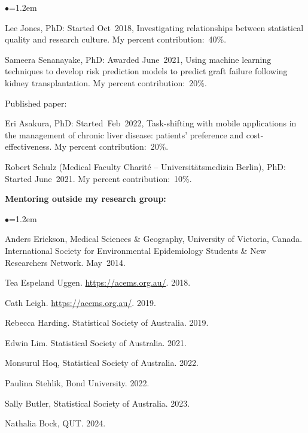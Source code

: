 \documentclass[a4paper,11pt]{article}
\renewcommand{\labelitemi}{$\bullet$}
\begin{document}
\begin{raggedright}
\begin{list}{\labelitemi}{\leftmargin=1.2em}
\item Lee Jones, PhD: Started Oct~2018, Investigating relationships between statistical quality and research culture. My percent contribution:~40\%.

\item Sameera Senanayake, PhD: Awarded June~2021, Using machine learning techniques to develop risk prediction models to predict graft failure following kidney transplantation. My percent contribution:~20\%.

Published paper: 

% 
\item Eri Asakura, PhD: Started~Feb~2022, Task-shifting with mobile applications in the management of chronic liver disease: patients’ preference and cost-effectiveness. My percent contribution:~20\%.


% 
\item Robert Schulz (Medical Faculty Charit\'{e} – Universit\"{a}tsmedizin Berlin), PhD: Started June~2021. My percent contribution:~10\%.
\end{list}

\textbf{Mentoring outside my research group:}

\begin{list}{\labelitemi}{\leftmargin=1.2em}\addtolength{\itemsep}{-0.5\baselineskip}
\item Anders Erickson, Medical Sciences \& Geography, University of Victoria, Canada. International Society for Environmental Epidemiology Students \& New Researchers Network. May~2014.
\item Tea Espeland Uggen. \href{ACEMS}{https://acems.org.au/}. 2018.
\item Cath Leigh. \href{ACEMS}{https://acems.org.au/}. 2019.
\item Rebecca Harding. Statistical Society of Australia. 2019.
\item Edwin Lim. Statistical Society of Australia. 2021.
\item Monsurul Hoq, Statistical Society of Australia. 2022.
\item Paulina Stehlik, Bond University. 2022.
\item Sally Butler, Statistical Society of Australia. 2023.
\item Nathalia Bock, QUT. 2024.
\end{list}


\end{raggedright}
\end{document}
